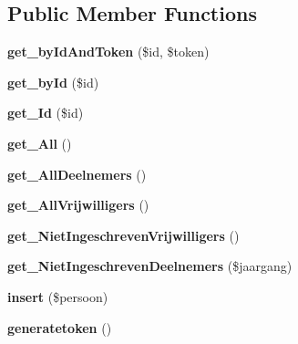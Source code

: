 \subsection*{Public Member Functions}
\begin{DoxyCompactItemize}
\item 
\mbox{\label{class_persoon__model_af6238e2ada132ef41f5ab612f027c879}} 
{\bfseries get\+\_\+by\+Id\+And\+Token} (\$id, \$token)
\item 
\mbox{\label{class_persoon__model_a0b88e4e63e880d5c6a5c18a12ac21272}} 
{\bfseries get\+\_\+by\+Id} (\$id)
\item 
\mbox{\label{class_persoon__model_ac4bd47d927cdbaa39a26b723f4c15aa7}} 
{\bfseries get\+\_\+\+Id} (\$id)
\item 
\mbox{\label{class_persoon__model_abf1694b8c451d02fb36b9fe6d6f54245}} 
{\bfseries get\+\_\+\+All} ()
\item 
\mbox{\label{class_persoon__model_af681009d10a4938d8df855aaadff3f8c}} 
{\bfseries get\+\_\+\+All\+Deelnemers} ()
\item 
\mbox{\label{class_persoon__model_a3ec3c4838d03ea025746333367305dfc}} 
{\bfseries get\+\_\+\+All\+Vrijwilligers} ()
\item 
\mbox{\label{class_persoon__model_a4402d0963685ffa0de9bba1ec29c4b60}} 
{\bfseries get\+\_\+\+Niet\+Ingeschreven\+Vrijwilligers} ()
\item 
\mbox{\label{class_persoon__model_a57ca8d2df6874e19154b614986f1a7a5}} 
{\bfseries get\+\_\+\+Niet\+Ingeschreven\+Deelnemers} (\$jaargang)
\item 
\mbox{\label{class_persoon__model_a2c311e5cb508141c1bae2566b3169615}} 
{\bfseries insert} (\$persoon)
\item 
\mbox{\label{class_persoon__model_ae56b3007dd99ca0a98820a33228fc87a}} 
{\bfseries generatetoken} ()
\item 

\end{DoxyCompactItemize}
